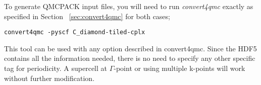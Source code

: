 





To generate QMCPACK input files, you will need to run  \textit{convert4qmc} exactly as specified in Section ~\ref{sec:convert4qmc} for both cases;
\begin{lstlisting}[style=SHELL]
convert4qmc -pyscf C_diamond-tiled-cplx
\end{lstlisting}

This tool can be used with any option described in convert4qmc. Since
the HDF5 contains all the information needed, there is no need to
specify any other specific tag for periodicity. A supercell at
$\Gamma$-point or using multiple k-points will work without further
modification.

